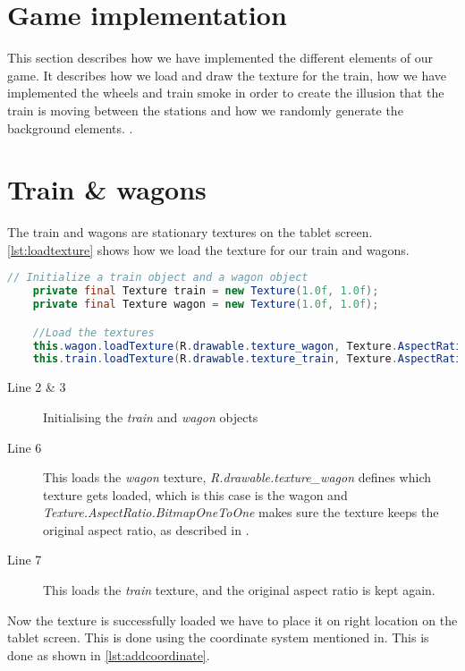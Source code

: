 \section{Game implementation}

This section describes how we have implemented the different elements of our game. It describes how we load and draw the texture for the train, how we have implemented the wheels and train smoke in order to create the illusion that the train is moving between the stations and how we randomly generate the background elements. .

\section{Train \& wagons}

The train and wagons are stationary textures on the tablet screen. \autoref{lst:loadtexture} shows how we load the texture for our train and wagons. 

\begin{lstlisting}[language=java,firstnumber=1,caption={Loading the texture for our train and wagons},label=lst:loadtexture] 
	// Initialize a train object and a wagon object
	private final Texture train = new Texture(1.0f, 1.0f);
	private final Texture wagon = new Texture(1.0f, 1.0f);

	//Load the textures
	this.wagon.loadTexture(R.drawable.texture_wagon, Texture.AspectRatio.BitmapOneToOne);
	this.train.loadTexture(R.drawable.texture_train, Texture.AspectRatio.BitmapOneToOne); 
\end{lstlisting}

\begin{description}
\item[Line 2 \& 3] Initialising the \textit{train} and \textit{wagon} objects 
\item[Line 6] This loads the \textit{wagon} texture, \textit{R.drawable.texture\_wagon} defines which texture gets loaded, which is this case is the wagon and \textit{Texture.AspectRatio.BitmapOneToOne} makes sure the texture keeps the original aspect ratio, as described in .
\item[Line 7] This loads the \textit{train} texture, and the original aspect ratio is kept again. 
\end{description}

Now the texture is successfully loaded we have to place it on right location on the tablet screen. This is done using the coordinate system mentioned in. This is done as shown in \autoref{lst:addcoordinate}.

